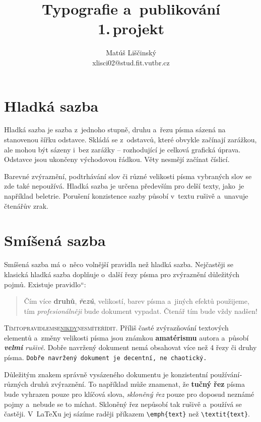 \documentclass[11pt,a4paper,twocolumn]{article}
\newcommand{\myuv}[1]{\quotedblbase #1\textquotedblleft}
\begin{document}
\title {Typografie a~publikování\\1.\,projekt }
\date{}
\author {Matúš Liščinský \\ xlisci02@stud.fit.vutbr.cz}
\maketitle

\section {Hladká sazba}
Hladká sazba je sazba z~jednoho stupně, druhu a~řezu pí­sma sázená na stanovenou šířku odstavce. 
Skládá se z~odstavců, které obvykle začínají­ zarážkou, ale mo\-hou být sázeny i~bez zarážky -- rozhodují­cí­ je celková grafická úprava. 
Odstavce jsou ukončeny východovou řádkou. Věty nesmějí začínat číslicí.

Barevné zvýraznění­, podtrhávání­ slov či různé ve\-li\-kos\-ti písma vybraných slov se zde také nepoužívá. Hladká sazba je určena především pro delší­ texty, jako~je napří­klad beletrie. Porušení­ konzistence sazby působí v~textu rušivě a~unavuje čtenářův zrak.

\section {Smíšená sazba}
Smíšená sazba má o~něco volnější­ pravidla než hladká sazba. Nejčastěji se klasická hladká sazba doplňuje o~další řezy pí­sma pro zvýraznění­ důležitých pojmů. Existuje \myuv{pravidlo}:

\begin{quotation}
Čí­m ví­ce \textbf{druhů}, \textbf{\emph{řezů}},  {\scriptsize velikostí}, barev pí\-­sma a~jiných efektů použijeme, tí­m \emph{profe\-sionálněji} bude dokument vypadat. Čtenář tím bude vždy {\Huge nadšen!} 
\end{quotation}

\textsc{Tí­mto{\hfill}pravidlem{\hfill}se{\hfill}\underline{nikdy}{\hfill}nesmí­te{\hfill}ří­dit.\break}
Příliš časté zvýrazňování textových elementů  a~změny velikosti {\tiny pí­sma} jsou {\LARGE známkou} \textbf{{\huge amatéris\-mu}} autora a~působí­ \textbf{\emph{velmi}} \emph{rušivě}. Dobře navrže\-ný dokument nemá obsahovat ví­ce než 4 řezy či druhy pí­sma. \texttt{Dobře navržený dokument je decentní­, ne chaotický.}

Důležitým znakem správně vysázeného dokumentu je konzistentní použí­vání­ různých druhů zvýraznění­. To napří­klad může znamenat, že \textbf{tučný řez} pí­sma bude vyhrazen pouze pro klíčová slova, \emph{skloněný řez} pouze pro doposud neznámé pojmy a~nebude se to míchat. Skloněný řez nepůsobí­ tak rušivě a~použí­vá se častěji.
V~\LaTeX{}u jej sází­me raději pří­kazem \verb|\emph{text}| než \verb|\textit{text}|. 
\end{document}
